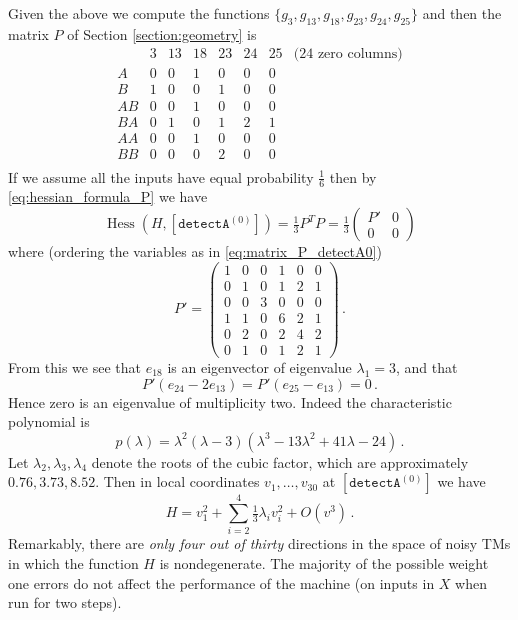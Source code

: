 \documentclass[english,letter paper,12pt,reqno]{article}
\theoremstyle{definition}
\newcommand{\detectA}{\texttt{detectA}}
\def\be{\begin{equation}}
\def\ee{\end{equation}}
\begin{document}
Given the above we compute the functions $\{ g_3, g_{13}, g_{18}, g_{23}, g_{24}, g_{25} \}$ and then the matrix $P$ of Section \ref{section:geometry} is
\be\label{eq:matrix_P_detectA0}
\begin{array}{c|cccccc|c}
 & 3 & 13 & 18 & 23 & 24 & 25 & \text{(24 zero columns)} \\
\hline
 A & 0 & 0 & 1 & 0 & 0 & 0 & \\
 B & 1 & 0 & 0 & 1 & 0 & 0 & \\
AB & 0 & 0 & 1 & 0 & 0 & 0 & \\
BA & 0 & 1 & 0 & 1 & 2 & 1 & \\
AA & 0 & 0 & 1 & 0 & 0 & 0 & \\
BB & 0 & 0 & 0 & 2 & 0 & 0 & \\
\end{array}
\ee
If we assume all the inputs have equal probability $\tfrac{1}{6}$ then by \eqref{eq:hessian_formula_P} we have
\be
\operatorname{Hess}(H, [\detectA^{(0)}]) = \tfrac{1}{3} P^T P = \tfrac{1}{3} \begin{pmatrix} P' & 0 \\ 0 & 0 \end{pmatrix}
\ee
where (ordering the variables as in \eqref{eq:matrix_P_detectA0})
\be
P' = \begin{pmatrix}
1 & 0 & 0 & 1 & 0 & 0 \\
0 & 1 & 0 & 1 & 2 & 1 \\
0 & 0 & 3 & 0 & 0 & 0 \\
1 & 1 & 0 & 6 & 2 & 1 \\
0 & 2 & 0 & 2 & 4 & 2 \\
0 & 1 & 0 & 1 & 2 & 1 \end{pmatrix}\,.
\ee
From this we see that $e_{18}$ is an eigenvector of eigenvalue $\lambda_1 = 3$, and that
\[
P'( e_{24} - 2 e_{13} ) = P'( e_{25} - e_{13} ) = 0\,.
\]
Hence zero is an eigenvalue of multiplicity two. Indeed the characteristic polynomial is
\[
p(\lambda) = \lambda^2( \lambda - 3 )( \lambda^3 - 13 \lambda^2 + 41 \lambda - 24 )\,.
\]
Let $\lambda_2, \lambda_3, \lambda_4$ denote the roots of the cubic factor, which are approximately $0.76, 3.73, 8.52$. Then in local coordinates $v_1,\ldots,v_{30}$ at $[\detectA^{(0)}]$ we have
\be\label{eq:decomp_H_detect}
H = v_1^2 + \sum_{i=2}^4 \tfrac{1}{3} \lambda_i v_i^2 + O(v^3)\,.
\ee
Remarkably, there are \emph{only four out of thirty} directions in the space of noisy TMs in which the function $H$ is nondegenerate. The majority of the possible weight one errors do not affect the performance of the machine (on inputs in $X$ when run for two steps).
\end{document}
